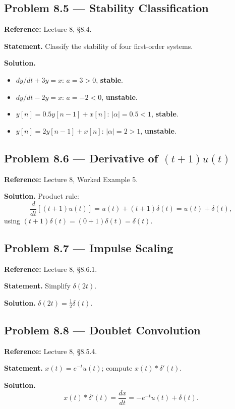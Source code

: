 \documentclass[11pt]{article}
\newcommand{\Conv}{\ast}
\begin{document}
\subsection{Problem 8.5 --- Stability Classification}
\textbf{Reference:} Lecture 8, \S 8.4.

\textbf{Statement.} Classify the stability of four first-order systems.

\textbf{Solution.}
\begin{itemize}[leftmargin=*]
  \item $dy/dt+3y=x$: $a=3>0$, \textbf{stable}.
  \item $dy/dt-2y=x$: $a=-2<0$, \textbf{unstable}.
  \item $y[n]=0.5y[n-1]+x[n]$: $|\alpha|=0.5<1$, \textbf{stable}.
  \item $y[n]=2y[n-1]+x[n]$: $|\alpha|=2>1$, \textbf{unstable}.
\end{itemize}

\subsection{Problem 8.6 --- Derivative of $(t+1)u(t)$}
\textbf{Reference:} Lecture 8, Worked Example 5.

\textbf{Solution.} Product rule:
\[
\frac{d}{dt}[(t+1)u(t)] = u(t) + (t+1)\delta(t) = u(t) + \delta(t),
\]
using $(t+1)\delta(t)=(0+1)\delta(t)=\delta(t)$.

\subsection{Problem 8.7 --- Impulse Scaling}
\textbf{Reference:} Lecture 8, \S 8.6.1.

\textbf{Statement.} Simplify $\delta(2t)$.

\textbf{Solution.} $\delta(2t) = \tfrac12\delta(t)$.

\subsection{Problem 8.8 --- Doublet Convolution}
\textbf{Reference:} Lecture 8, \S 8.5.4.

\textbf{Statement.} $x(t)=e^{-t}u(t)$; compute $x(t)\Conv\delta'(t)$.

\textbf{Solution.}
\[
x(t)\Conv\delta'(t) = \frac{dx}{dt} = -e^{-t}u(t)+\delta(t).
\]
\end{document}

